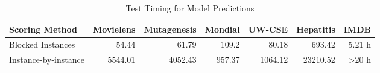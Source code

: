 \documentclass{acm_proc_article-sp}
\begin{document}
\begin{table}[htbp]
  \centering
        \caption{Model Manager}
  \label{tab:addlabel}%
\end{table}%





\begin{table}[htbp]
  \centering
     \resizebox{0.5\textwidth}{!}
{  \begin{tabular}{|l|r|r|r|r|r|r|}
    \hline
    Scoring Method & Movielens & Mutagenesis & Mondial & UW-CSE & Hepatitis & IMDB \\
    \hline
    Blocked Instances & 54.44 & 61.79 & 109.2 & 80.18 & 693.42 & 5.21 h \\
    \hline
    Instance-by-instance & 5544.01 & 4052.43 & 957.37 & 1064.12 & 23210.52 & >20 h \\
    \hline
    \end{tabular}%
}
  \caption{Test Timing for Model Predictions}
  \label{tab:addlabel}%
\end{table}%
\end{document}
